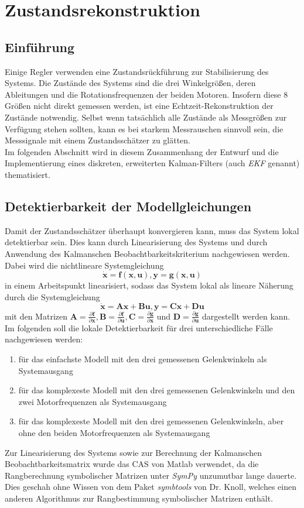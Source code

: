 \documentclass[times, 9pt,twocolumn]{article}
\begin{document}
	\clearpage %
	\section{Zustandsrekonstruktion}
	\subsection{Einf\"uhrung}
	Einige Regler verwenden eine Zustandsr\"uckf\"uhrung zur Stabilisierung des Systems. Die Zust\"ande des Systems sind die drei Winkelgr\"oßen, deren Ableitungen und die Rotationsfrequenzen der beiden Motoren. Insofern diese 8 Gr\"oßen nicht direkt gemessen werden, ist eine Echtzeit-Rekonstruktion der Zustände notwendig. 
	Selbst wenn tatsächlich alle Zustände als Messgrößen zur Verfügung stehen sollten, kann es bei starkem Messrauschen sinnvoll sein, die Messsignale mit einem Zustandsschätzer zu glätten. \\
	Im folgenden Abschnitt wird in diesem Zusammenhang der Entwurf und die Implementierung eines diskreten, erweiterten Kalman-Filters (auch \textit{EKF} genannt)  thematisiert. 
	\subsection{Detektierbarkeit der Modellgleichungen}
	Damit der Zustandsschätzer überhaupt konvergieren kann, muss das System lokal detektierbar sein. Dies kann durch Linearisierung des Systems und durch Anwendung des Kalmanschen Beobachtbarkeitskriterium nachgewiesen werden. Dabei wird die nichtlineare Systemgleichung  $$ \bm{\dot x} = \bm{f}(\bm{x},\bm{u}), \bm y = \bm{g}(\bm{x}, \bm u) $$ in einem Arbeitspunkt linearisiert, sodass das System lokal als lineare Näherung durch die Systemgleichung $$ \bm{\dot x} = \bm{A} \bm{x} + \bm{B} \bm{u}, \bm y = \bm C \bm x + \bm D \bm u $$ mit den Matrizen $ \bm A = \frac{\partial{ \bm f}}{\partial{\bm x}}, \bm B = \frac{\partial{ \bm f}}{\partial{\bm u}} , \bm C = \frac{\partial{ \bm g}}{\partial{\bm x}}$ und $\bm D = \frac{\partial{ \bm g}}{\partial{\bm u}}$ dargestellt werden kann. Im folgenden soll die lokale Detektierbarkeit für drei unterschiedliche Fälle nachgewiesen werden:
	\begin{enumerate}
		\item für das einfachste Modell mit den drei gemessenen Gelenkwinkeln als Systemausgang
		\item für das komplexeste Modell mit den drei gemessenen Gelenkwinkeln und den zwei Motorfrequenzen als Systemausgang
		\item für das komplexeste Modell mit den drei gemessenen Gelenkwinkeln, aber ohne den beiden Motorfrequenzen als Systemausgang
	\end{enumerate}
	Zur Linearisierung des Systems sowie zur Berechnung der Kalmanschen Beobachtbarkeitsmatrix wurde das CAS von Matlab verwendet, da die Rangberechnung symbolischer Matrizen unter \textit{SymPy} unzumutbar lange dauerte. Dies geschah ohne Wissen von dem Paket \textit{symbtools} von Dr. Knoll, welches einen anderen Algorithmus zur Rangbestimmung symbolischer Matrizen enthält. 
\end{document}
